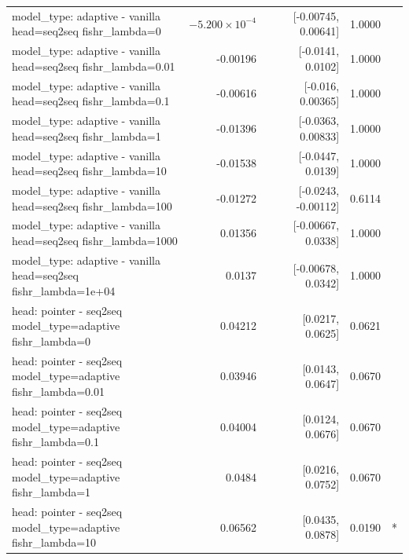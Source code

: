 \documentclass[10pt]{article}
\makeatletter
\newcommand{\stackcell}[1]{\begin{tabular}[t]{@{}l@{}}#1\end{tabular}}
\makeatother
\begin{document}
{\begin{longtable}{lrrrl}
\stackcell{model\_type: adaptive - vanilla\\\footnotesize head=seq2seq fishr\_lambda=0 } & $-5.200\times10^{-4}$ & [-0.00745, 0.00641] & 1.0000 & \\
\stackcell{model\_type: adaptive - vanilla\\\footnotesize head=seq2seq fishr\_lambda=0.01 } & -0.00196 & [-0.0141, 0.0102] & 1.0000 & \\
\stackcell{model\_type: adaptive - vanilla\\\footnotesize head=seq2seq fishr\_lambda=0.1 } & -0.00616 & [-0.016, 0.00365] & 1.0000 & \\
\stackcell{model\_type: adaptive - vanilla\\\footnotesize head=seq2seq fishr\_lambda=1 } & -0.01396 & [-0.0363, 0.00833] & 1.0000 & \\
\stackcell{model\_type: adaptive - vanilla\\\footnotesize head=seq2seq fishr\_lambda=10 } & -0.01538 & [-0.0447, 0.0139] & 1.0000 & \\
\stackcell{model\_type: adaptive - vanilla\\\footnotesize head=seq2seq fishr\_lambda=100 } & -0.01272 & [-0.0243, -0.00112] & 0.6114 & \\
\stackcell{model\_type: adaptive - vanilla\\\footnotesize head=seq2seq fishr\_lambda=1000 } & 0.01356 & [-0.00667, 0.0338] & 1.0000 & \\
\stackcell{model\_type: adaptive - vanilla\\\footnotesize head=seq2seq fishr\_lambda=1e+04 } & 0.0137 & [-0.00678, 0.0342] & 1.0000 & \\
\stackcell{head: pointer - seq2seq\\\footnotesize model\_type=adaptive fishr\_lambda=0 } & 0.04212 & [0.0217, 0.0625] & 0.0621 & \\
\stackcell{head: pointer - seq2seq\\\footnotesize model\_type=adaptive fishr\_lambda=0.01 } & 0.03946 & [0.0143, 0.0647] & 0.0670 & \\
\stackcell{head: pointer - seq2seq\\\footnotesize model\_type=adaptive fishr\_lambda=0.1 } & 0.04004 & [0.0124, 0.0676] & 0.0670 & \\
\stackcell{head: pointer - seq2seq\\\footnotesize model\_type=adaptive fishr\_lambda=1 } & 0.0484 & [0.0216, 0.0752] & 0.0670 & \\
\stackcell{head: pointer - seq2seq\\\footnotesize model\_type=adaptive fishr\_lambda=10 } & 0.06562 & [0.0435, 0.0878] & 0.0190 & *\\

\end{longtable}}
\end{document}
